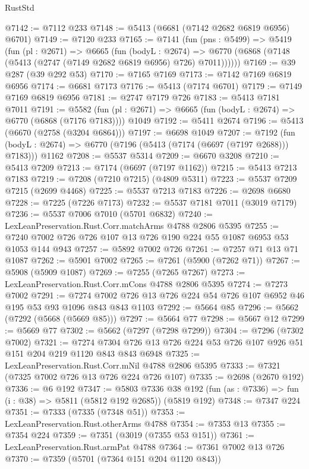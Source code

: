 \begin{lexlean}{RustStd}
\begin{coremodule}
@7142 := @7112 @233
@7148 := @5413 (@6681 (@7142 @2682 @6819 @6956) @6701)
@7149 := @7120 @233
@7165 := @7141
    (fun (pns : @5499) =>
    @5419
      (fun (pl : @2671) =>
      @6665
        (fun (bodyL : @2674) =>
        @6770 (@6868 (@7148 (@5413 (@2747 (@7149 @2682 @6819 @6956) @726) @7011))))))
@7169 := @39 @287 (@39 @292 @53)
@7170 := @7165 @7169
@7173 := @7142 @7169 @6819 @6956
@7174 := @6681 @7173
@7176 := @5413 (@7174 @6701)
@7179 := @7149 @7169 @6819 @6956
@7181 := @2747 @7179 @726
@7183 := @5413 @7181 @7011
@7191 := @5582
    (fun (pl : @2671) => @6665 (fun (bodyL : @2674) => @6770 (@6868 (@7176 @7183))))
    @1049
@7192 := @5411 @2674
@7196 := @5413 (@6670 (@2758 (@3204 @6864)))
@7197 := @6698 @1049
@7207 := @7192
    (fun (bodyL : @2674) => @6770 (@7196 (@5413 (@7174 (@6697 (@7197 @2688))) @7183)))
    @1162
@7208 := @5537 @5314
@7209 := @6670 @3208
@7210 := @5413 @7209
@7213 := @7174 (@6697 (@7197 @1162))
@7215 := @5413 @7213 @7183
@7219 := @7208 (@7210 @7215) (@4809 @5311)
@7223 := @5537 @7209 @7215 (@2699 @4468)
@7225 := @5537 @7213 @7183
@7226 := @2698 @6680
@7228 := @7225 (@7226 @7173)
@7232 := @5537 @7181 @7011 (@3019 @7179)
@7236 := @5537 @7006 @7010 (@5701 @6832)
@7240 := LexLeanPreservation.Rust.Corr.matchArms @4788 @2806 @5395
@7255 := @7240 @7002 @726 @726 @107 @13 @726 @190 @224 @55 @1087 @6953 @53 @1053 @144 @943
@7257 := @5892 @7002 @726
@7261 := @7257 @71 @13 @71 @1087
@7262 := @5901 @7002
@7265 := @7261 (@5900 (@7262 @71))
@7267 := @5908 (@5909 @1087)
@7269 := @7255 (@7265 @7267)
@7273 := LexLeanPreservation.Rust.Corr.mCons @4788 @2806 @5395
@7274 := @7273 @7002
@7291 := @7274 @7002 @726 @13 @726 @224 @54 @726 @107 @6952 @46 @195 @53 @93 @1096 @843 @843 @1103
@7292 := @5664 @85
@7296 := @5662 (@7292 (@5668 (@5669 @85)))
@7297 := @5664 @77
@7298 := @5667 @12
@7299 := @5669 @77
@7302 := @5662 (@7297 (@7298 @7299))
@7304 := @7296 (@7302 @7002)
@7321 := @7274 @7304 @726 @13 @726 @224 @53 @726 @107 @926 @51 @151 @204 @219 @1120 @843 @843 @6948
@7325 := LexLeanPreservation.Rust.Corr.mNil @4788 @2806 @5395
@7333 := @7321 (@7325 @7002 @726 @13 @726 @224 @726 @107)
@7335 := @2698 (@2670 @192)
@7336 := @6 @192
@7347 := @5803
    @7336
    @38
    @192
    (fun (as : @7336) => fun (i : @38) => @5811 (@5812 @192 @2685))
    (@5819 @192)
@7348 := @7347 @224
@7351 := @7333 (@7335 (@7348 @51))
@7353 := LexLeanPreservation.Rust.otherArms @4788
@7354 := @7353 @13
@7355 := @7354 @224
@7359 := @7351 (@3019 (@7355 @53 @151))
@7361 := LexLeanPreservation.Rust.armPat @4788
@7364 := @7361 @7002 @13 @726
@7370 := @7359 (@5701 (@7364 @151 @204 @1120 @843))

\end{coremodule}
\end{lexlean}
